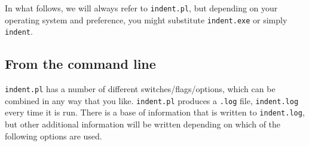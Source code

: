 In what follows, we will always refer to \lstinline!indent.pl!, but depending on 
your operating system and preference, you might substitute \lstinline!indent.exe! or
simply \lstinline!indent!.
     
\subsection{From the command line}\label{sec:commandline}
\lstinline!indent.pl! has a number of different switches/flags/options, which 
can be combined in any way that you like. \lstinline!indent.pl! 
produces a \lstinline!.log! file, \lstinline!indent.log! every time it
is run. There is a base of information that is written to \lstinline!indent.log!,
but other additional information will be written depending 
on which of the following options are used.
 	 	 	 	 	
